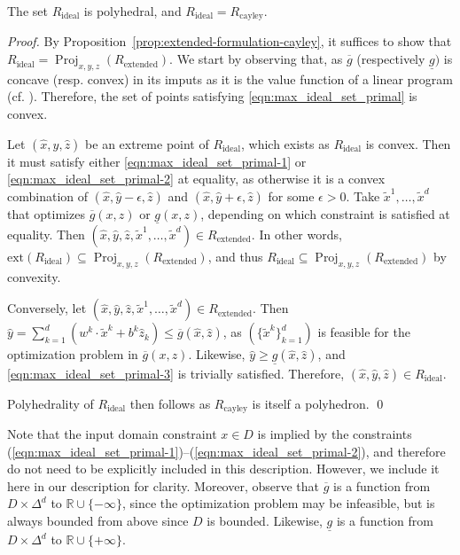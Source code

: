 \documentclass[smallextended]{svjour3}
\newcommand{\Proj}{\operatorname{Proj}}
\newcommand{\tx}{\widetilde{x}}
\newcommand{\Rcayley}{R_{\operatorname{cayley}}}
\newcommand{\Rextended}{R_{\operatorname{extended}}}
\newcommand{\Rideal}{R_{\operatorname{ideal}}}
\newcommand{\ubar}[1]{\underline{#1}}
\renewcommand{\bar}[1]{\overline{#1}}
\begin{document}
\begin{proposition}\label{prop:max_ideal_set_primal}
    The set $\Rideal$ is polyhedral, and $\Rideal = \Rcayley$.
\end{proposition}
\begin{proof}
By Proposition~\ref{prop:extended-formulation-cayley}, it suffices to show that $\Rideal = \Proj_{x,y,z}(\Rextended)$. We start by observing that, as $\bar{g}$ (respectively $\ubar{g})$ is concave (resp. convex) in its imputs as it is the value function of a linear program (cf. \cite[Theorem 5.1]{Bertsimas:1997}). Therefore, the set of points satisfying \eqref{eqn:max_ideal_set_primal} is convex.

Let $(\hat{x}, \hat{y}, \hat{z})$ be an extreme point of $\Rideal$, which exists as $\Rideal$ is convex. Then it must satisfy either \eqref{eqn:max_ideal_set_primal-1} or \eqref{eqn:max_ideal_set_primal-2} at equality, as otherwise it is a convex combination of $(\hat{x}, \hat{y} - \epsilon, \hat{z})$ and $(\hat{x}, \hat{y} + \epsilon, \hat{z})$ for some $\epsilon > 0$. Take $\tx^1, \ldots, \tx^d$ that optimizes $\bar{g}(x,z)$ or $\ubar{g}(x,z)$, depending on which constraint is satisfied at equality. Then $(\hat{x}, \hat{y}, \hat{z}, \tx^1, \ldots, \tx^d) \in \Rextended$. In other words, $\text{ext}(\Rideal) \subseteq \Proj_{x,y,z}(\Rextended)$, and thus $\Rideal \subseteq \Proj_{x,y,z}(\Rextended)$ by convexity.

Conversely, let $(\hat{x},\hat{y},\hat{z},\tx^1,\ldots,\tx^d) \in \Rextended$. Then $\hat{y} = \sum_{k=1}^d (w^k \cdot \tx^k + b^k\hat{z}_k) \leq \bar{g}(\hat{x}, \hat{z})$, as $(\{\tx^k\}_{k=1}^d)$ is feasible for the optimization problem in $\bar{g}(x, z)$. %
Likewise, $\hat{y} \geq \ubar{g}(\hat{x}, \hat{z})$, and \eqref{eqn:max_ideal_set_primal-3} is trivially satisfied. Therefore, $(\hat{x}, \hat{y}, \hat{z}) \in \Rideal$.

Polyhedrality of $\Rideal$ then follows as $\Rcayley$ is itself a polyhedron.
\qed\end{proof}

Note that the input domain constraint $x \in D$ is implied by the constraints (\ref{eqn:max_ideal_set_primal-1})--(\ref{eqn:max_ideal_set_primal-2}), and therefore do not need to be explicitly included in this description. However, we include it here in our description for clarity. Moreover, observe that $\bar{g}$ is a function from $D \times \Delta^d$ to $\mathbb{R} \cup \{-\infty\}$, since the optimization problem may be infeasible, but is always bounded from above since $D$ is bounded. Likewise, $\ubar{g}$ is a function from $D \times \Delta^d$ to $\mathbb{R} \cup \{+\infty\}$.
\end{document}
